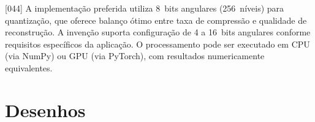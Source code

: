 \documentclass[12pt,a4paper]{article}
\begin{document}
{[044]} A implementação preferida utiliza 8~bits angulares
(256~níveis) para quantização, que oferece balanço ótimo entre
taxa de compressão e qualidade de reconstrução. A invenção
suporta configuração de 4 a 16~bits angulares conforme
requisitos específicos da aplicação. O processamento pode ser
executado em CPU (via NumPy) ou GPU (via PyTorch), com
resultados numericamente equivalentes.

\newpage
\section{Desenhos}

\end{document}
